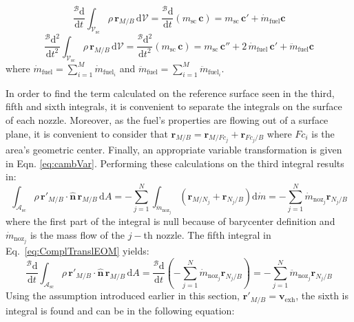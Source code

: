 \begin{equation}\label{eq:eq20}
	\frac{^{\mathcal{B}} \text{d}}{\text{d}t}\int_{\mathcal{V}_{\text{sc}}} \rho\,\bm{r}_{M/B}\,\text{d}\mathcal{V} = \frac{^{\mathcal{B}} \text{d}}{\text{d}t}\left(m_{\text{sc}}\,\bm{c}\right) = m_{\text{sc}}\,\bm{c}' + \dot{m}_{\text{fuel}}\bm{c}
\end{equation}
\begin{equation}\label{eq:eq21}
	\frac{^{\mathcal{B}} \text{d}^2}{\text{d}t^2}\int_{\mathcal{V}_{\text{sc}}} \rho\,\bm{r}_{M/B} \,\text{d}\mathcal{V} = \frac{^{\mathcal{B}} \text{d}^2}{\text{d}t^2} \left(m_{\text{sc}}\,\bm{c}\right) = m_{\text{sc}}\,\bm{c}'' + 2\,\dot{m}_{\text{fuel}}\,\bm{c}' + \ddot{m}_{\text{fuel}}\bm{c}
\end{equation}
where $\dot{m}_{\text{fuel}} = \sum_{i=1}^{M}\dot{m}_{\text{fuel}_i}$ and $\ddot{m}_{\text{fuel}} = \sum_{i=1}^{M}\ddot{m}_{\text{fuel}_i}$.

In order to find the term calculated on the reference surface seen in the third, fifth and sixth integrals,  it is convenient to separate the integrals on the surface of each nozzle. Moreover, as the fuel's properties are flowing out of a surface plane, it is convenient to consider that  $\bm{r}_{M/B} = \bm{r}_{M/Fc_j}+ \bm{r}_{Fc_j/B} $ where $Fc_i$ is the area's geometric center. Finally, an appropriate variable transformation is given in Eqn. \eqref{eq:cambVar}. Performing these calculations on the third integral results in:
\begin{equation}\label{eq:eq22}
	\int_{\mathcal{A}_{\text{sc}}} \rho\,\bm{r}'_{M/B}\cdot\bm{\hat{n}}\,\bm{r}_{M/B}\,\text{d}A =-\sum_{j=1}^{N} \int_{\dot{m}_{\text{noz}_j}}\left(\bm{r}_{M/N_j}+ \bm{r}_{N_j/B}\right)\text{d}\dot{m}  =-\sum_{j=1}^{N}\dot{m}_{\text{noz}_j}\bm{r}_{N_j/B}
\end{equation}
\noindent
where the first part of the integral is null because of barycenter definition and $\dot{m}_{\text{noz}_j}$ is the mass flow of the $j-$th nozzle. The fifth integral in Eq.~\eqref{eq:ComplTranslEOM} yields:
\begin{equation}\label{eq:eq23}
	\frac{^{\mathcal{B}} \text{d}}{\text{d}t} \int_{\mathcal{A}_\text{sc}} \rho\,\bm{r}'_{M/B}\cdot\bm{\hat{n}} \,\bm{r}_{M/B}\,\text{d}A = \frac{^{\mathcal{B}} \text{d}}{\text{d}t} \left(-\sum_{j=1}^{N}\dot{m}_{\text{noz}_j}\bm{r}_{N_j/B}\right) = -\sum_{j=1}^{N}\ddot{m}_{\text{noz}_j}\bm{r}_{N_j/B}
\end{equation}
\noindent
Using the assumption introduced earlier in this section, $\bm{r}'_{M/B} = \bm{v}_{\text{exh}}$, the sixth is integral is found and can be in the following equation:

